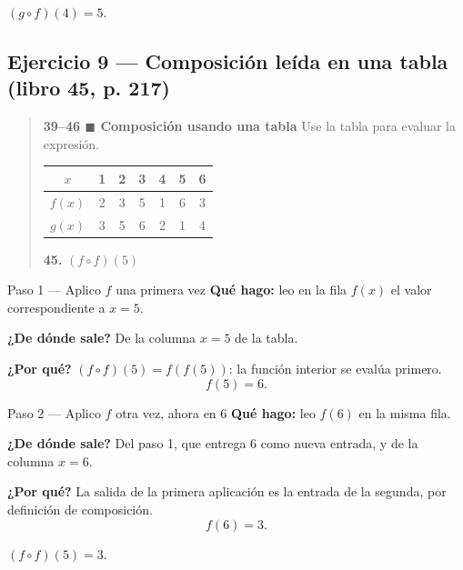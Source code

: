 \documentclass[11pt]{article}
\begin{document}
\begin{resp}
$(g\circ f)(4)=5$.
\end{resp}

\subsection*{Ejercicio 9 — Composición leída en una tabla (libro 45, p. 217)}

\begin{quote}
\textbf{39--46 $\blacksquare$ Composición usando una tabla} \quad Use la tabla para evaluar la expresión.

\begin{center}
\begin{tabular}{|c|c|c|c|c|c|c|}
\hline
$x$ & 1 & 2 & 3 & 4 & 5 & 6 \\ \hline
$f(x)$ & 2 & 3 & 5 & 1 & 6 & 3 \\ \hline
$g(x)$ & 3 & 5 & 6 & 2 & 1 & 4 \\ \hline
\end{tabular}
\end{center}

\textbf{45.} $(f\circ f)(5)$
\end{quote}

\begin{paso}{Paso 1 --- Aplico $f$ una primera vez}
\textbf{Qué hago:} leo en la fila $f(x)$ el valor correspondiente a $x=5$.

\textbf{¿De dónde sale?} De la columna $x=5$ de la tabla.

\textbf{¿Por qué?} $(f\circ f)(5)=f(f(5))$: la función interior se evalúa primero.
\[
f(5)=6 .
\]
\end{paso}

\begin{paso}{Paso 2 --- Aplico $f$ otra vez, ahora en $6$}
\textbf{Qué hago:} leo $f(6)$ en la misma fila.

\textbf{¿De dónde sale?} Del paso 1, que entrega $6$ como nueva entrada, y de la columna $x=6$.

\textbf{¿Por qué?} La salida de la primera aplicación es la entrada de la segunda, por definición de composición.
\[
f(6)=3 .
\]
\end{paso}

\begin{resp}
$(f\circ f)(5)=3$.
\end{resp}

\end{document}
